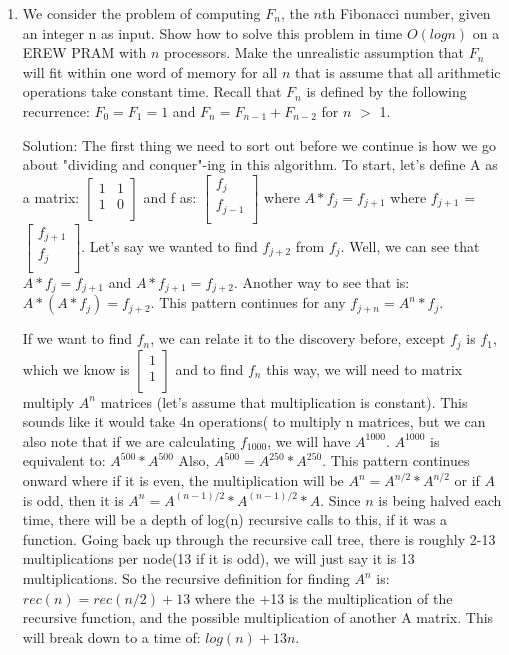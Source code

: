 \documentclass{article}
\begin{document}
\begin{enumerate}
\newline
\item We consider the problem of computing $F_n$, the $n$th Fibonacci number, given an integer n as input. Show how to solve this problem in time $O(logn)$ on a EREW PRAM with $n$ processors. Make the unrealistic assumption that $F_n$ will fit within one word of memory for all $n$ that is assume that all arithmetic operations take constant time. Recall that $F_n$ is defined by the following recurrence: $F_0 = F_1 = 1$ and $F_n = F_{n-1} + F_{n-2}$ for $n$ $>$ 1.

Solution: The first thing we need to sort out before we continue is how we go about "dividing and conquer"-ing in this algorithm. To start, let's define A as a matrix: 
$\begin{bmatrix} 
1 & 1\\
1 & 0\\
\end{bmatrix}$
and f as: 
$\begin{bmatrix} 
f_j\\
f_{j-1}\\
\end{bmatrix}$
where $A*f_j = f_{j+1}$ where $f_{j+1}$ = $\begin{bmatrix} 
f_{j+1}\\
f_j\\
\end{bmatrix}$.
Let's say we wanted to find $f_{j+2}$ from $f_j$. Well, we can see that $A*f_j = f_{j+1}$ and $A*f_{j+1} = f_{j+2}$. Another way to see that is: $A*(A*f_{j}) = f_{j+2}$. This pattern continues for any $f_{j+n} = A^n*f_{j}$.

If we want to find $f_n$, we can relate it to the discovery before, except $f_j$ is $f_1$, which we know is  
$\begin{bmatrix} 
1\\
1\\
\end{bmatrix}$  
and to find $f_n$ this way, we will need to matrix multiply $A^n$ matrices (let's assume that multiplication is constant). This sounds like it would take 4n operations( to multiply n matrices, but we can also note that if we are calculating $f_1000$, we will have $A^1000$. $A^1000$ is equivalent to: $A^500 * A^500$ Also, $A^500 = A^250 * A ^250$. This pattern continues onward where if it is even, the multiplication will be $A^n = A^{n/2} * A^{n/2}$ or if $A$ is odd, then it is $A^n = A^{(n-1)/2} * A^{(n-1)/2}*A$. Since $n$ is being halved each time, there will be a depth of log(n) recursive calls to this, if it was a function. Going back up through the recursive call tree, there is roughly 2-13 multiplications per node(13 if it is odd), we will just say it is 13 multiplications. So the recursive definition for finding $A^n$ is: $rec(n) = rec(n/2) + 13$ where the +13 is the multiplication of the recursive function, and the possible multiplication of another A matrix. This will break down to a time of: $log(n) + 13n$.


\end{enumerate}
\end{document}
